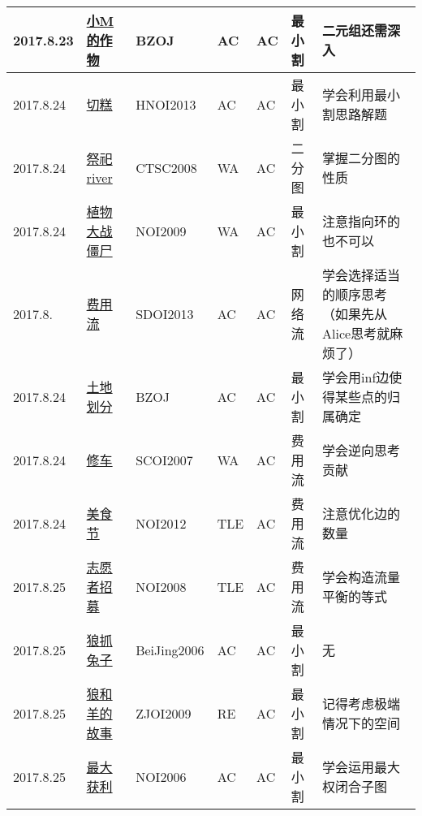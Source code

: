 \documentclass[a4paper]{article}
\begin{document}
\begin{longtable}{|p{1.5cm}|p{2.5cm}|p{1.6cm}|p{1.6cm}|p{1cm}|p{3cm}|p{4cm}|}
		\hline
		2017.8.23 & \href {http://www.lydsy.com/JudgeOnline/problem.php?id=3438}{小M的作物}
		 & BZOJ & AC & AC & 最小割 & 二元组还需深入\\
		
		\hline
		2017.8.24 & \href {http://www.lydsy.com/JudgeOnline/problem.php?id=3144}{切糕}
		 & HNOI2013 & AC & AC & 最小割 & 学会利用最小割思路解题\\
		
		\hline
		2017.8.24 & \href {http://www.lydsy.com/JudgeOnline/problem.php?id=1143}{祭祀river}
		 & CTSC2008 & WA & AC & 二分图 & 掌握二分图的性质\\
		
		\hline
		2017.8.24 & \href {http://www.lydsy.com/JudgeOnline/problem.php?id=1565}{植物大战僵尸}
		 & NOI2009 & WA & AC & 最小割 & 注意指向环的也不可以\\
		
		\hline
		2017.8. & \href {http://www.lydsy.com/JudgeOnline/problem.php?id=3130}{费用流}
		 & SDOI2013 & AC & AC & 网络流 & 学会选择适当的顺序思考（如果先从Alice思考就麻烦了）\\
		
		\hline
		2017.8.24 & \href {http://www.lydsy.com/JudgeOnline/problem.php?id=3511}{土地划分}
		 & BZOJ & AC & AC & 最小割 & 学会用inf边使得某些点的归属确定\\
		
		\hline
		2017.8.24 & \href {http://www.lydsy.com/JudgeOnline/problem.php?id=1070}{修车}
		 & SCOI2007 & WA & AC & 费用流 & 学会逆向思考贡献\\
		
		\hline
		2017.8.24 & \href {http://www.lydsy.com/JudgeOnline/problem.php?id=2879}{美食节}
		 & NOI2012 & TLE & AC & 费用流 & 注意优化边的数量\\
		
		\hline
		2017.8.25 & \href {http://www.lydsy.com/JudgeOnline/problem.php?id=1061}{志愿者招募}
		 & NOI2008 & TLE & AC & 费用流 & 学会构造流量平衡的等式\\
		
		\hline
		2017.8.25 & \href {http://www.lydsy.com/JudgeOnline/problem.php?id=1001}{狼抓兔子}
		 & BeiJing2006 & AC & AC & 最小割 & 无\\
		
		\hline
		2017.8.25 & \href {http://www.lydsy.com/JudgeOnline/problem.php?id=1412}{狼和羊的故事}
		 & ZJOI2009 & RE & AC & 最小割 & 记得考虑极端情况下的空间\\
		
		\hline
		2017.8.25 & \href {http://www.lydsy.com/JudgeOnline/problem.php?id=1497}{最大获利}
		 & NOI2006 & AC & AC & 最小割 & 学会运用最大权闭合子图\\
		

\end{longtable}
\end{document}
